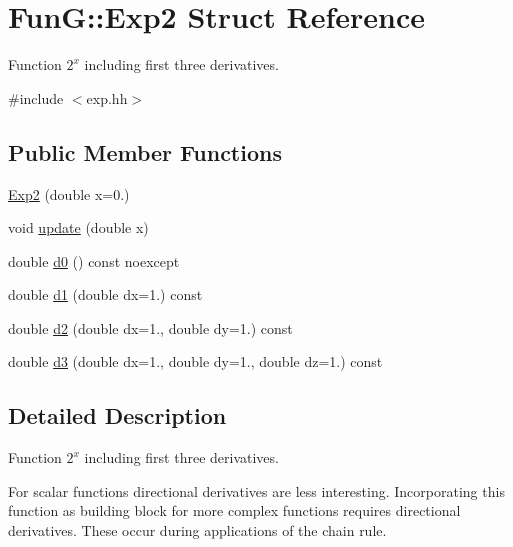 \hypertarget{structFunG_1_1Exp2}{\section{\-Fun\-G\-:\-:\-Exp2 \-Struct \-Reference}
\label{structFunG_1_1Exp2}
}


\-Function $2^x$ including first three derivatives.  




{\ttfamily \#include $<$exp.\-hh$>$}

\subsection*{\-Public \-Member \-Functions}
\begin{DoxyCompactItemize}
\item 
\hyperlink{structFunG_1_1Exp2_aa5e03d1e3a39a1c2151cdfe092461060}{\-Exp2} (double x=0.)
\item 
void \hyperlink{structFunG_1_1Exp2_a256e50dac0e06814d2fb150ac997ea5d}{update} (double x)
\item 
double \hyperlink{structFunG_1_1Exp2_a70a452fa4b190e2c427fd87f17c98dc5}{d0} () const noexcept
\item 
double \hyperlink{structFunG_1_1Exp2_a45eae0e2d4a7d3ec8c02eeb237fcc8ae}{d1} (double dx=1.) const 
\item 
double \hyperlink{structFunG_1_1Exp2_a5f4e6755ebce5994f79a0711725bf9a3}{d2} (double dx=1., double dy=1.) const 
\item 
double \hyperlink{structFunG_1_1Exp2_aff3797bff08d2ec89a72a8ce7779d08e}{d3} (double dx=1., double dy=1., double dz=1.) const 
\end{DoxyCompactItemize}


\subsection{\-Detailed \-Description}
\-Function $2^x$ including first three derivatives. 

\-For scalar functions directional derivatives are less interesting. \-Incorporating this function as building block for more complex functions requires directional derivatives. \-These occur during applications of the chain rule. 

